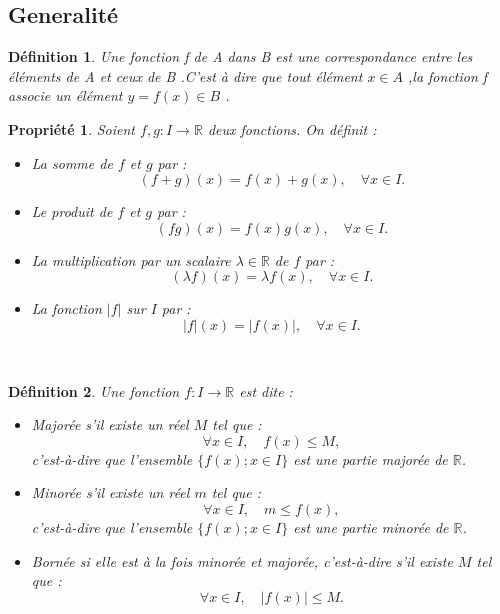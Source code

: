 \documentclass[a4paper,12pt]{article} %
\newtheorem{definition}{Définition}[section]
\newtheorem{propriete}{Propriété}[section]
\begin{document}
	\subsection{Generalité}
	\begin{definition}
	   	Une fonction	f de A dans B est une correspondance entre les éléments de A et ceux de B .C'est à dire que tout élément $x\in A$ ,la fonction f associe un élément $y=f(x)  \in B$ .		
		
	\end{definition}
		\begin{propriete}
		Soient \( f , g : I \to \mathbb{R} \) deux fonctions. On définit :
		
		
		\begin{itemize}
			\item La somme de \( f \) et \( g \) par :
			\[
			(f + g)(x) = f(x) + g(x), \quad \forall x \in I.
			\]
			
			\item Le produit de \( f \) et \( g \) par :
			\[
			(fg)(x) = f(x) g(x), \quad \forall x \in I.
			\]
			
			\item La multiplication par un scalaire \( \lambda \in \mathbb{R} \) de \( f \) par :
			\[
			(\lambda f)(x) = \lambda f(x), \quad \forall x \in I.
			\]
			
			\item La fonction \( |f| \) sur \( I \) par :
			\[
			|f|(x) = |f(x)|, \quad \forall x \in I.
			\]
		\end{itemize}
	\end{propriete}
	   \
		\begin{definition}
		 Une fonction \( f : I \to \mathbb{R} \) est dite :
		
		\begin{itemize}
			\item \textit{Majorée} s’il existe un réel \( M \) tel que :
			\[
			\forall x \in I, \quad f(x) \leq M,
			\]
			c’est-à-dire que l’ensemble \( \{ f(x) ; x \in I \} \) est une partie majorée de \( \mathbb{R} \).
			
			\item \textit{Minorée} s’il existe un réel \( m \) tel que :
			\[
			\forall x \in I, \quad m \leq f(x),
			\]
			c’est-à-dire que l’ensemble \( \{ f(x) ; x \in I \} \) est une partie minorée de \( \mathbb{R} \).
			
			\item \textit{Bornée} si elle est à la fois minorée et majorée, c’est-à-dire s’il existe \( M \) tel que :
			\[
			\forall x \in I, \quad |f(x)| \leq M.
			\]
		\end{itemize}
      \end{definition}  
\end{document}
